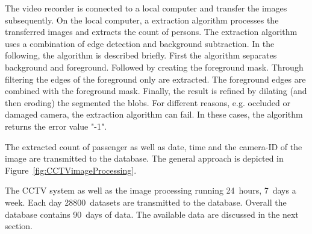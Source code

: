 The video recorder is connected to a local computer and transfer the images subsequently. On the local computer, a extraction algorithm processes the transferred images and extracts the count of persons.
The extraction algorithm uses a combination of edge detection and background subtraction. In the  following, the algorithm is described briefly.
First the algorithm separates background and foreground. Followed by creating the foreground mask.
Through filtering the edges of the foreground only are extracted. The foreground edges are combined with the foreground mask. Finally, the result is refined by dilating (and then eroding) the segmented the blobs.
For different reasons, e.g. occluded or damaged camera, the extraction algorithm can fail. In these cases, the algorithm returns the error value "-1".

The extracted count of passenger as well as date, time and the camera-ID of the image are transmitted to the database. The general approach is depicted in Figure~\ref{fig:CCTVimageProcessing}.


The CCTV system as well as the image processing running 24~hours, 7~days a week. Each day 28800~datasets are transmitted to the database. Overall the database contains 90~days of data. The available data are discussed in the next section.